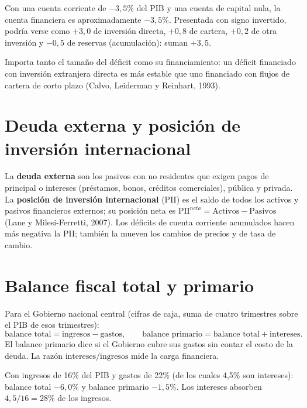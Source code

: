 \begin{dato}
Con una cuenta corriente de $-3{,}5\%$ del PIB y una cuenta de capital nula, la cuenta financiera es aproximadamente
$-3{,}5\%$. Presentada con signo invertido, podría verse como $+3{,}0$ de inversión directa, $+0{,}8$ de cartera,
$+0{,}2$ de otra inversión y $-0{,}5$ de reservas (acumulación): suman $+3{,}5$.
\end{dato}

\begin{leer}
Importa tanto el tamaño del déficit como su financiamiento: un déficit financiado con inversión extranjera directa es más
estable que uno financiado con flujos de cartera de corto plazo (Calvo, Leiderman y Reinhart, 1993).
\end{leer}

\section{Deuda externa y posición de inversión internacional}
La \textbf{deuda externa} son los pasivos con no residentes que exigen pagos de principal o intereses (préstamos,
bonos, créditos comerciales), pública y privada. La \textbf{posición de inversión internacional} (PII) es el saldo de
todos los activos y pasivos financieros externos; su posición neta es $\text{PII}^{neta}=\text{Activos}-\text{Pasivos}$
(Lane y Milesi-Ferretti, 2007). Los déficits de cuenta corriente acumulados hacen más negativa la PII; también la
mueven los cambios de precios y de tasa de cambio.

\section{Balance fiscal total y primario}
\label{es:f:fiscal}
Para el Gobierno nacional central (cifras de caja, suma de cuatro trimestres sobre el PIB de esos trimestres):
\[
\text{balance total}=\text{ingresos}-\text{gastos},\qquad
\text{balance primario}=\text{balance total}+\text{intereses}.
\]
El balance primario dice si el Gobierno cubre sus gastos sin contar el costo de la deuda. La razón
$\text{intereses}/\text{ingresos}$ mide la carga financiera.

\begin{dato}
Con ingresos de 16\% del PIB y gastos de 22\% (de los cuales 4,5\% son intereses): balance total $-6{,}0\%$ y balance
primario $-1{,}5\%$. Los intereses absorben $4{,}5/16=28\%$ de los ingresos.
\end{dato}

